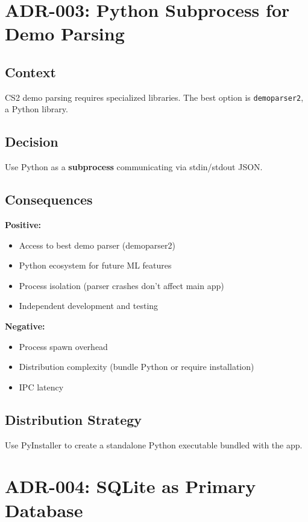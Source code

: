 \section{ADR-003: Python Subprocess for Demo Parsing}

\subsection{Context}
CS2 demo parsing requires specialized libraries. The best option is \texttt{demoparser2}, a Python library.

\subsection{Decision}
Use Python as a \textbf{subprocess} communicating via stdin/stdout JSON.

\subsection{Consequences}

\textbf{Positive:}
\begin{itemize}
    \item Access to best demo parser (demoparser2)
    \item Python ecosystem for future ML features
    \item Process isolation (parser crashes don't affect main app)
    \item Independent development and testing
\end{itemize}

\textbf{Negative:}
\begin{itemize}
    \item Process spawn overhead
    \item Distribution complexity (bundle Python or require installation)
    \item IPC latency
\end{itemize}

\subsection{Distribution Strategy}
Use PyInstaller to create a standalone Python executable bundled with the app.

\section{ADR-004: SQLite as Primary Database}


